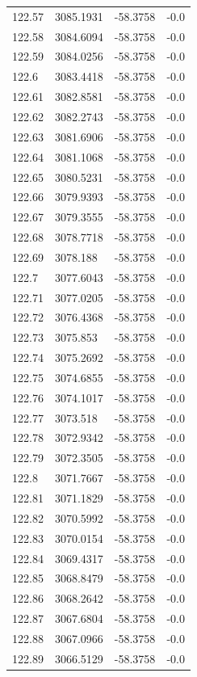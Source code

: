 \begin{table}[H]
\begin{tabular}{llll}
122.57 & 3085.1931 & -58.3758 & -0.0 \\
122.58 & 3084.6094 & -58.3758 & -0.0 \\
122.59 & 3084.0256 & -58.3758 & -0.0 \\
122.6 & 3083.4418 & -58.3758 & -0.0 \\
122.61 & 3082.8581 & -58.3758 & -0.0 \\
122.62 & 3082.2743 & -58.3758 & -0.0 \\
122.63 & 3081.6906 & -58.3758 & -0.0 \\
122.64 & 3081.1068 & -58.3758 & -0.0 \\
122.65 & 3080.5231 & -58.3758 & -0.0 \\
122.66 & 3079.9393 & -58.3758 & -0.0 \\
122.67 & 3079.3555 & -58.3758 & -0.0 \\
122.68 & 3078.7718 & -58.3758 & -0.0 \\
122.69 & 3078.188 & -58.3758 & -0.0 \\
122.7 & 3077.6043 & -58.3758 & -0.0 \\
122.71 & 3077.0205 & -58.3758 & -0.0 \\
122.72 & 3076.4368 & -58.3758 & -0.0 \\
122.73 & 3075.853 & -58.3758 & -0.0 \\
122.74 & 3075.2692 & -58.3758 & -0.0 \\
122.75 & 3074.6855 & -58.3758 & -0.0 \\
122.76 & 3074.1017 & -58.3758 & -0.0 \\
122.77 & 3073.518 & -58.3758 & -0.0 \\
122.78 & 3072.9342 & -58.3758 & -0.0 \\
122.79 & 3072.3505 & -58.3758 & -0.0 \\
122.8 & 3071.7667 & -58.3758 & -0.0 \\
122.81 & 3071.1829 & -58.3758 & -0.0 \\
122.82 & 3070.5992 & -58.3758 & -0.0 \\
122.83 & 3070.0154 & -58.3758 & -0.0 \\
122.84 & 3069.4317 & -58.3758 & -0.0 \\
122.85 & 3068.8479 & -58.3758 & -0.0 \\
122.86 & 3068.2642 & -58.3758 & -0.0 \\
122.87 & 3067.6804 & -58.3758 & -0.0 \\
122.88 & 3067.0966 & -58.3758 & -0.0 \\
122.89 & 3066.5129 & -58.3758 & -0.0 \\

\end{tabular}
\end{table}
